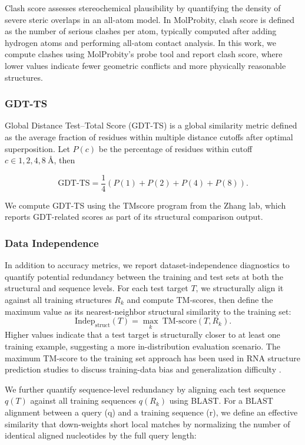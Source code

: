Clash score assesses stereochemical plausibility by quantifying the density of severe steric overlaps in an all-atom model. In MolProbity, clash score is defined as the number of serious clashes per atom, typically computed after adding hydrogen atoms and performing all-atom contact analysis. In this work, we compute clashes using MolProbity’s probe tool and report clash score, where lower values indicate fewer geometric conflicts and more physically reasonable structures\cite{chen2010molprobity}. 

\subsubsection{GDT-TS}

Global Distance Test–Total Score (GDT-TS) is a global similarity metric defined as the average fraction of residues within multiple distance cutoffs after optimal superposition. Let $P(c)$ be the percentage of residues within cutoff $c\in{1,2,4,8}\ \text{\AA}$, then  

$$  
\mathrm{GDT}\text{-}\mathrm{TS}=\frac{1}{4}\left(P(1)+P(2)+P(4)+P(8)\right).  
$$  

We compute GDT-TS using the TMscore program from the Zhang lab, which reports GDT-related scores as part of its structural comparison output\cite{zhang2004tmscore}.


\subsubsection{Data Independence}

In addition to accuracy metrics, we report dataset-independence diagnostics to quantify potential redundancy between the training and test sets at both the structural and sequence levels. For each test target $T$, we structurally align it against all training structures ${R_k}$ and compute TM-scores, then define the maximum value as its nearest-neighbor structural similarity to the training set:  
$$
\mathrm{Indep}_{\mathrm{struct}}(T)=\max_k\ \mathrm{TM}\text{-}\mathrm{score}(T,R_k).  
$$
Higher values indicate that a test target is structurally closer to at least one training example, suggesting a more in-distribution evaluation scenario. The maximum TM-score to the training set approach has been used in RNA structure prediction studies to discuss training-data bias and generalization difficulty \cite{Ludaic2025limits}.

We further quantify sequence-level redundancy by aligning each test sequence $q(T)$ against all training sequences $q(R_k)$ using BLAST. For a BLAST alignment between a query (q) and a training sequence (r), we define an effective similarity that down-weights short local matches by normalizing the number of identical aligned nucleotides by the full query length:  


